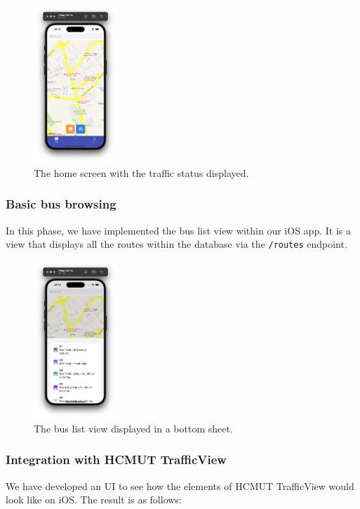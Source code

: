 \begin{figure}[H]
    \centering
    \includegraphics[width=0.28\textwidth]{assets/images/Implementation/traffic_status_view.png}
    \caption{The home screen with the traffic status displayed.}
    \label{fig:traffic_status_view}
\end{figure}

\subsubsection{Basic bus browsing}
In this phase, we have implemented the bus list view within our iOS app. It is a view that displays all the routes within the database via the \lstinline{/routes} endpoint. 
\begin{figure}[H]
    \centering
    \includegraphics[width=0.28\textwidth]{assets/images/Implementation/bus_view.png}
    \caption{The bus list view displayed in a bottom sheet.}
    \label{fig:bus_view_ios}
\end{figure}


\subsubsection{Integration with HCMUT TrafficView}
We have developed an UI to see how the elements of HCMUT TrafficView would look like on iOS. The result is as follows:

